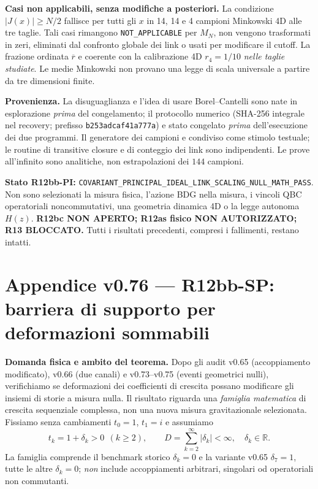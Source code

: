 \documentclass[11pt,a4paper]{article}
\begin{document}
\textbf{Casi non applicabili, senza modifiche a posteriori.} La condizione $|J(x)|\ge N/2$ fallisce per tutti gli $x$ in 14, 14 e 4 campioni Minkowski 4D alle tre taglie. Tali casi rimangono \texttt{NOT\_APPLICABLE} per $M_N$, non vengono trasformati in zeri, eliminati dal confronto globale dei link o usati per modificare il cutoff. La frazione ordinata $\overline r$ e coerente con la calibrazione 4D $r_4=1/10$ \emph{nelle taglie studiate}. Le medie Minkowski non provano una legge di scala universale a partire da tre dimensioni finite.

\textbf{Provenienza.} La disuguaglianza e l'idea di usare Borel--Cantelli sono nate in esplorazione \emph{prima} del congelamento; il protocollo numerico (SHA-256 integrale nel recovery; prefisso \texttt{b253adcaf41a777a}) e stato congelato \emph{prima} dell'esecuzione dei due programmi. Il generatore dei campioni e condiviso come stimolo testuale; le routine di transitive closure e di conteggio dei link sono indipendenti. Le prove all'infinito sono analitiche, non estrapolazioni dei $144$ campioni.

\textbf{Stato R12bb-PI:} \texttt{COVARIANT\_PRINCIPAL\_IDEAL\_LINK\_SCALING\_NULL\_MATH\_PASS}. Non sono selezionati la misura fisica, l'azione BDG nella misura, i vincoli QBC operatoriali noncommutativi, una geometria dinamica 4D o la legge autonoma $H(z)$. \textbf{R12bc NON APERTO; R12as fisico NON AUTORIZZATO; R13 BLOCCATO.}
Tutti i risultati precedenti, compresi i fallimenti, restano intatti.


\clearpage
\section*{Appendice v0.76 --- R12bb-SP: barriera di supporto per deformazioni sommabili}
\textbf{Domanda fisica e ambito del teorema.} Dopo gli audit v0.65 (accoppiamento modificato), v0.66 (due canali) e v0.73--v0.75 (eventi geometrici nulli), verifichiamo se deformazioni dei coefficienti di crescita possano modificare gli insiemi di storie a misura nulla. Il risultato riguarda una \emph{famiglia matematica} di crescita sequenziale complessa, non una nuova misura gravitazionale selezionata. Fissiamo senza cambiamenti $t_0=1$, $t_1=i$ e assumiamo
\begin{equation}
\boxed{\quad t_k=1+\delta_k>0\ \ (k\ge2),\qquad
D=\sum_{k=2}^{\infty}|\delta_k|<\infty,\quad \delta_k\in\mathbb R.\quad}
\tag{SP.1}
\end{equation}
La famiglia comprende il benchmark storico $\delta_k=0$ e la variante v0.65 $\delta_7=1$, tutte le altre $\delta_k=0$; \emph{non} include accoppiamenti arbitrari, singolari od operatoriali non commutanti.
\end{document}
